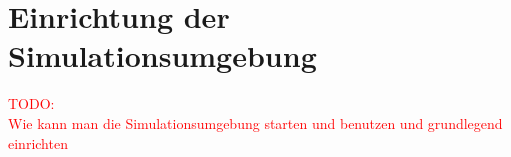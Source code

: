

%















\section{Einrichtung der Simulationsumgebung}\label{appendix1:Einrichtung_der_Simulationsumgebung}
\textcolor{red}{TODO:\\
Wie kann man die Simulationsumgebung starten und benutzen und grundlegend einrichten
}
